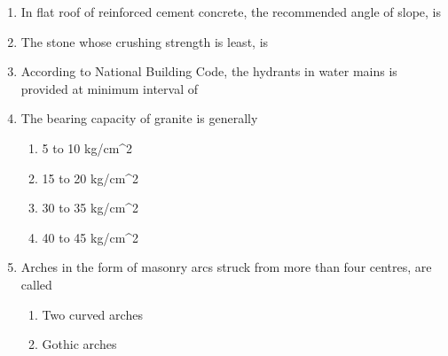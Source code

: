 \documentclass[11pt,a4paper]{article}
\begin{document}
\begin{enumerate}
\item{In flat roof of reinforced cement concrete, the recommended angle of slope, is}
\\
\item{The stone whose crushing strength is least, is}
\\
\item{According to National Building Code, the hydrants in water mains is provided at minimum interval of}
\\
\item{The bearing capacity of granite is generally}
\begin{enumerate}[label=\Alph*.]
\item{5 to 10 kg/cm\^{}2}
\item{15 to 20 kg/cm\^{}2}
\item{30 to 35 kg/cm\^{}2}
\item{40 to 45 kg/cm\^{}2}
\end{enumerate}
\item{Arches in the form of masonry arcs struck from more than four centres, are called}
\begin{enumerate}[label=\Alph*.]
\item{Two curved arches}
\item{Gothic arches}

\end{enumerate}
\end{enumerate}
\end{document}
